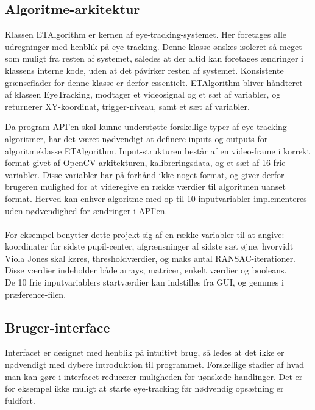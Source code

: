 \documentclass[rapport.tex]{subfiles}
\begin{document}
	\subsection{Algoritme-arkitektur}
	Klassen ETAlgorithm er kernen af eye-tracking-systemet. Her foretages alle udregninger med henblik på eye-tracking. Denne klasse ønskes isoleret så meget som muligt fra resten af systemet, således at der altid kan foretages ændringer i klassens interne kode, uden at det påvirker resten af systemet. Konsistente grænseflader for denne klasse er derfor essentielt. 
	ETAlgorithm bliver håndteret af klassen EyeTracking, modtager et videosignal og et sæt af variabler, og returnerer XY-koordinat, trigger-niveau, samt et sæt af variabler. 
	
	Da program API'en skal kunne understøtte forskellige typer af eye-tracking-algoritmer, har det været nødvendigt at definere inputs og outputs for algoritmeklasse ETAlgorithm. Input-strukturen består af en video-frame i korrekt format givet af OpenCV-arkitekturen, kalibreringsdata, og et sæt af 16 frie variabler. Disse variabler har på forhånd ikke noget format, og giver derfor brugeren mulighed for at videregive en række værdier til algoritmen uanset format. Herved kan enhver algoritme med op til 10 inputvariabler implementeres uden nødvendighed for ændringer i API'en.\\
	\\
	 For eksempel benytter dette projekt sig af en række variabler til at angive: koordinater for sidste pupil-center, afgrænsninger af sidste sæt øjne, hvorvidt Viola Jones skal køres, thresholdværdier, og maks antal RANSAC-iterationer.  Disse værdier indeholder både arrays, matricer, enkelt værdier og  booleans.
	\\
	De 10 frie inputvariablers startværdier kan indstilles fra GUI, og gemmes i præference-filen. 
	\subsection{Bruger-interface}
	Interfacet er designet med henblik på intuitivt brug, så ledes at det ikke er nødvendigt med dybere introduktion til programmet. Forskellige stadier af hvad man kan gøre i interfacet reducerer muligheden for uønskede handlinger. Det er for eksempel ikke muligt at starte eye-tracking før nødvendig opsætning er fuldført. 
	
\end{document}
